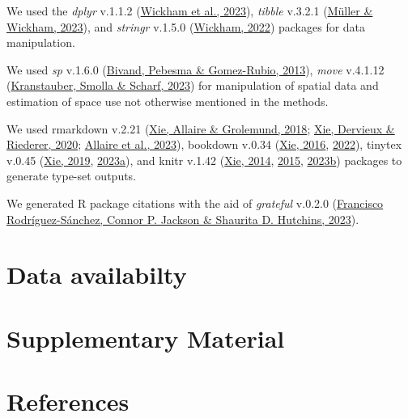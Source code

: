\documentclass[10pt,a4paper]{article}
\begin{document}
We used the \emph{dplyr} v.1.1.2 (\protect\hyperlink{ref-dplyr}{Wickham et al., 2023}), \emph{tibble} v.3.2.1 (\protect\hyperlink{ref-tibble}{Müller \& Wickham, 2023}),
and \emph{stringr} v.1.5.0 (\protect\hyperlink{ref-stringr}{Wickham, 2022}) packages for data manipulation.

We used \emph{sp} v.1.6.0 (\protect\hyperlink{ref-sp}{Bivand, Pebesma \& Gomez-Rubio, 2013}), \emph{move} v.4.1.12 (\protect\hyperlink{ref-move}{Kranstauber, Smolla \& Scharf, 2023}) for manipulation of spatial data and estimation of space use not otherwise mentioned in the methods.

We used rmarkdown v.2.21 (\protect\hyperlink{ref-rmarkdown2018}{Xie, Allaire \& Grolemund, 2018}; \protect\hyperlink{ref-rmarkdown2020}{Xie, Dervieux \& Riederer, 2020}; \protect\hyperlink{ref-rmarkdown2023}{Allaire et al., 2023}), bookdown v.0.34 (\protect\hyperlink{ref-bookdown2016}{Xie, 2016}, \protect\hyperlink{ref-R-bookdown}{2022}), tinytex v.0.45 (\protect\hyperlink{ref-tinytex2019}{Xie, 2019}, \protect\hyperlink{ref-tinytex2023}{2023a}), and knitr v.1.42 (\protect\hyperlink{ref-knitr2014}{Xie, 2014}, \protect\hyperlink{ref-knitr2015}{2015}, \protect\hyperlink{ref-knitr2023}{2023b}) packages to generate type-set outputs.

We generated R package citations with the aid of \emph{grateful} v.0.2.0 (\protect\hyperlink{ref-grateful}{Francisco Rodríguez-Sánchez, Connor P. Jackson \& Shaurita D. Hutchins, 2023}).

\hypertarget{data-availabilty}{%
\section{Data availabilty}\label{data-availabilty}}

\hypertarget{supplementary-material}{%
\section{Supplementary Material}\label{supplementary-material}}

\hypertarget{references}{%
\section*{References}\label{references}}
\end{document}
